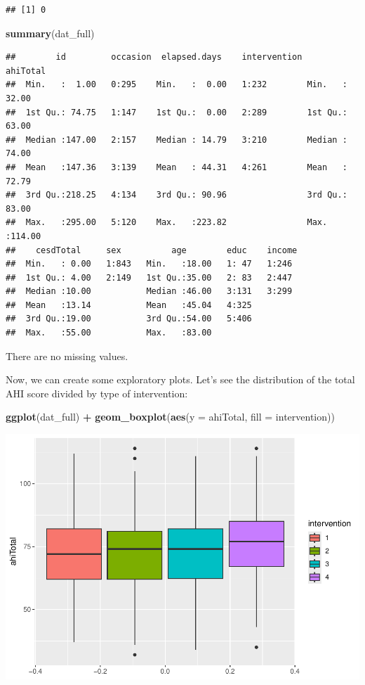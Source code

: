\documentclass[
]{article}
\newenvironment{Shaded}{\begin{snugshade}}{\end{snugshade}}
\newcommand{\AttributeTok}[1]{\textcolor[rgb]{0.13,0.29,0.53}{#1}}
\newcommand{\FunctionTok}[1]{\textcolor[rgb]{0.13,0.29,0.53}{\textbf{#1}}}
\newcommand{\NormalTok}[1]{#1}
\newcommand{\SpecialCharTok}[1]{\textcolor[rgb]{0.81,0.36,0.00}{\textbf{#1}}}
\begin{document}
\begin{verbatim}
## [1] 0
\end{verbatim}

\begin{Shaded}
\begin{Highlighting}[]
\FunctionTok{summary}\NormalTok{(dat\_full)}
\end{Highlighting}
\end{Shaded}

\begin{verbatim}
##        id         occasion  elapsed.days    intervention    ahiTotal     
##  Min.   :  1.00   0:295    Min.   :  0.00   1:232        Min.   : 32.00  
##  1st Qu.: 74.75   1:147    1st Qu.:  0.00   2:289        1st Qu.: 63.00  
##  Median :147.00   2:157    Median : 14.79   3:210        Median : 74.00  
##  Mean   :147.36   3:139    Mean   : 44.31   4:261        Mean   : 72.79  
##  3rd Qu.:218.25   4:134    3rd Qu.: 90.96                3rd Qu.: 83.00  
##  Max.   :295.00   5:120    Max.   :223.82                Max.   :114.00  
##    cesdTotal     sex          age        educ    income 
##  Min.   : 0.00   1:843   Min.   :18.00   1: 47   1:246  
##  1st Qu.: 4.00   2:149   1st Qu.:35.00   2: 83   2:447  
##  Median :10.00           Median :46.00   3:131   3:299  
##  Mean   :13.14           Mean   :45.04   4:325          
##  3rd Qu.:19.00           3rd Qu.:54.00   5:406          
##  Max.   :55.00           Max.   :83.00
\end{verbatim}

There are no missing values.

Now, we can create some exploratory plots. Let's see the distribution of
the total AHI score divided by type of intervention:

\begin{Shaded}
\begin{Highlighting}[]
\FunctionTok{ggplot}\NormalTok{(dat\_full) }\SpecialCharTok{+}
  \FunctionTok{geom\_boxplot}\NormalTok{(}\FunctionTok{aes}\NormalTok{(}\AttributeTok{y =}\NormalTok{ ahiTotal, }\AttributeTok{fill =}\NormalTok{ intervention))}
\end{Highlighting}
\end{Shaded}

\includegraphics{RealData_example_files/figure-latex/unnamed-chunk-8-1.pdf}
\end{document}
